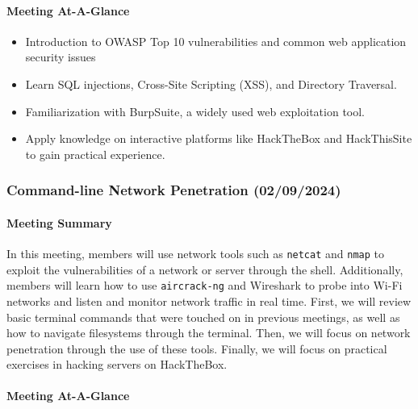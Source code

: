 \documentclass[
  letterpaper,
  DIV=11,
  numbers=noendperiod]{scrartcl}
\let\oldparagraph\paragraph
\renewcommand{\paragraph}[1]{\oldparagraph{#1}\mbox{}}
\providecommand{\tightlist}{%
  \setlength{\itemsep}{0pt}\setlength{\parskip}{0pt}}\usepackage{longtable,booktabs,array}
\begin{document}
\hypertarget{meeting-at-a-glance-13}{%
\paragraph{Meeting At-A-Glance}\label{meeting-at-a-glance-13}}

\begin{itemize}
\tightlist
\item
  Introduction to OWASP Top 10 vulnerabilities and common web
  application security issues
\item
  Learn SQL injections, Cross-Site Scripting (XSS), and Directory
  Traversal.
\item
  Familiarization with BurpSuite, a widely used web exploitation tool.
\item
  Apply knowledge on interactive platforms like HackTheBox and
  HackThisSite to gain practical experience.
\end{itemize}

\newpage{}

\hypertarget{command-line-network-penetration-02092024}{%
\subsubsection{Command-line Network Penetration
(02/09/2024)}\label{command-line-network-penetration-02092024}}

\hypertarget{meeting-summary-14}{%
\paragraph{Meeting Summary}\label{meeting-summary-14}}

In this meeting, members will use network tools such as \texttt{netcat}
and \texttt{nmap} to exploit the vulnerabilities of a network or server
through the shell. Additionally, members will learn how to use
\texttt{aircrack-ng} and Wireshark to probe into Wi-Fi networks and
listen and monitor network traffic in real time. First, we will review
basic terminal commands that were touched on in previous meetings, as
well as how to navigate filesystems through the terminal. Then, we will
focus on network penetration through the use of these tools. Finally, we
will focus on practical exercises in hacking servers on HackTheBox.

\hypertarget{meeting-at-a-glance-14}{%
\paragraph{Meeting At-A-Glance}\label{meeting-at-a-glance-14}}
\end{document}
